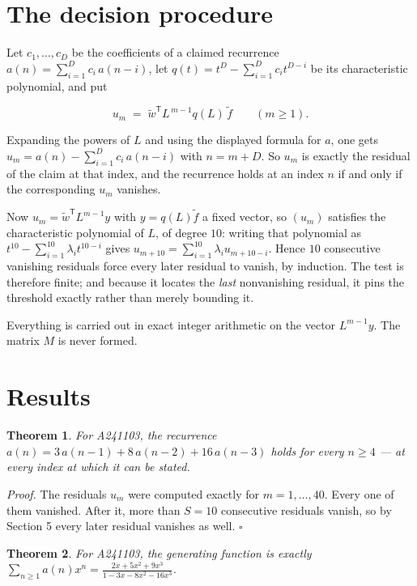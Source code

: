 \documentclass[11pt]{article}
\newtheorem{theorem}{Theorem}
\theoremstyle{definition}
\begin{document}
\section{The decision procedure}

Let $c_1,\dots,c_D$ be the coefficients of a claimed recurrence $a(n) = \sum_{i=1}^{D} c_i\,a(n-i)$, let $q(t) = t^{D} - \sum_{i=1}^{D} c_i t^{D-i}$ be its characteristic polynomial, and put

\[u_m \;=\; \tilde w^{\mathsf T} L^{\,m-1} q(L)\,\tilde f \qquad (m \ge 1).\]

Expanding the powers of $L$ and using the displayed formula for $a$, one gets $u_m = a(n) - \sum_{i=1}^{D} c_i\,a(n-i)$ with $n = m + D$. So $u_m$ is exactly the residual of the claim at that index, and the recurrence holds at an index $n$ if and only if the corresponding $u_m$ vanishes.

Now $u_m = \tilde w^{\mathsf T} L^{m-1} y$ with $y = q(L)\tilde f$ a fixed vector, so $(u_m)$ satisfies the characteristic polynomial of $L$, of degree $10$: writing that polynomial as $t^{10} - \sum_{i=1}^{10} \lambda_i t^{10-i}$ gives $u_{m+10} = \sum_{i=1}^{10} \lambda_i u_{m+10-i}$. Hence $10$ consecutive vanishing residuals force every later residual to vanish, by induction. The test is therefore finite; and because it locates the {\itshape last} nonvanishing residual, it pins the threshold exactly rather than merely bounding it.

Everything is carried out in exact integer arithmetic on the vector $L^{m-1}y$. The matrix $M$ is never formed.

\section{Results}

\begin{theorem} For A241103, the recurrence $a(n) = 3\,a(n-1) + 8\,a(n-2) + 16\,a(n-3)$ holds for every $n \ge 4$ --- at every index at which it can be stated.\end{theorem}

{\itshape Proof.} The residuals $u_m$ were computed exactly for $m = 1,\dots,40$. Every one of them vanished. After it, more than $S = 10$ consecutive residuals vanish, so by Section 5 every later residual vanishes as well. $\square$

\begin{theorem} For A241103, the generating function is exactly $\sum_{n\ge 1} a(n)x^n = \frac{2x + 5x^{2} + 9x^{3}}{1 - 3x - 8x^{2} - 16x^{3}}$.\end{theorem}
\end{document}
